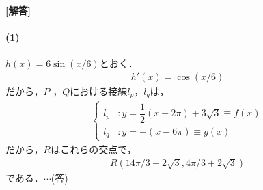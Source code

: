 \documentclass[../../main.tex]{subfiles}
\begin{document}
\begin{oframed}
  
\end{oframed}

{\bf [解答]}

\paragraph{(1)}
$h(x)=6\sin(x/6)$とおく．
\begin{align}
  h'(x)=\cos(x/6)
\end{align}
だから，$P$ ，$Q$における接線$l_p$，$l_q$は，
\begin{align}
  \begin{cases}
    l_p&:y=\dfrac{1}{2}(x-2\pi)+3\sqrt{3}\equiv f(x) \\
    l_q&:y=-(x-6\pi)\equiv g(x)
  \end{cases}
\end{align}
だから，$R$はこれらの交点で，
\begin{align}
  R(14\pi/3-2\sqrt{3},4\pi/3+2\sqrt{3})
\end{align}
である．$\cdots$(答)
\end{document}
